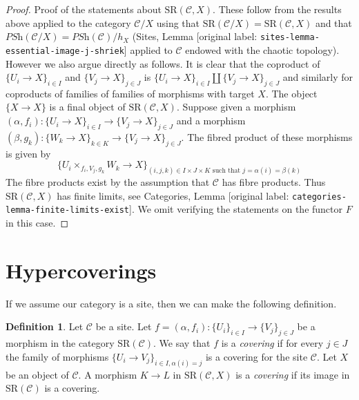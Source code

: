 \documentclass[10pt,a4paper]{article}
\theoremstyle{plain}
\theoremstyle{definition}
\newtheorem{definition}[subsection]{Definition}
\theoremstyle{remark}
\numberwithin{equation}{subsection}
\begin{document}
\begin{proof}
\medskip\noindent
Proof of the statements about $\text{SR}(\mathcal{C}, X)$.
These follow from the results above applied to the category
$\mathcal{C}/X$ using that
$\text{SR}(\mathcal{C}/X) = \text{SR}(\mathcal{C}, X)$ and that
$\textit{PSh}(\mathcal{C}/X) = \textit{PSh}(\mathcal{C})/h_X$
(Sites, Lemma \textnormal{[original label: \nolinkurl{sites-lemma-essential-image-j-shriek}]} applied
to $\mathcal{C}$ endowed with the chaotic topology). However
we also argue directly as follows.
It is clear that the coproduct of
$\{U_i \to X\}_{i \in I}$ and $\{V_j \to X\}_{j \in J}$
is $\{U_i \to X\}_{i \in I} \amalg \{V_j \to X\}_{j \in J}$
and similarly for coproducts of
families of families of morphisms with target $X$.
The object $\{X \to X\}$ is a final
object of $\text{SR}(\mathcal{C}, X)$.
Suppose given a morphism
$(\alpha, f_i) : \{U_i \to X\}_{i \in I} \to \{V_j \to X\}_{j \in J}$
and a morphism
$(\beta, g_k) : \{W_k \to X\}_{k \in K} \to \{V_j \to X\}_{j \in J}$.
The fibred product of these morphisms is given by
$$
\{ U_i \times_{f_i, V_j, g_k} W_k \to X \}_{(i, j, k) \in I \times J \times K
\text{ such that } j = \alpha(i) = \beta(k)}
$$
The fibre products exist by the assumption that
$\mathcal{C}$ has fibre products.
Thus $\text{SR}(\mathcal{C}, X)$ has finite limits,
see Categories, Lemma \textnormal{[original label: \nolinkurl{categories-lemma-finite-limits-exist}]}.
We omit verifying the statements on the functor $F$ in this case.
\end{proof}





\section{Hypercoverings}
\label{section-hypercoverings}

\noindent
If we assume our category is a site, then we can make the following
definition.

\begin{definition}
\label{definition-covering-SR}
Let $\mathcal{C}$ be a site. Let
$f = (\alpha, f_i) : \{U_i\}_{i \in I} \to \{V_j\}_{j \in J}$
be a morphism in the category $\text{SR}(\mathcal{C})$.
We say that $f$ is a {\it covering} if for every $j \in J$ the
family of morphisms $\{U_i \to V_j\}_{i \in I, \alpha(i) = j}$
is a covering for the site $\mathcal{C}$.
Let $X$ be an object of $\mathcal{C}$.
A morphism $K \to L$ in $\text{SR}(\mathcal{C}, X)$ is
a {\it covering} if its image in $\text{SR}(\mathcal{C})$ is
a covering.
\end{definition}
\end{document}
